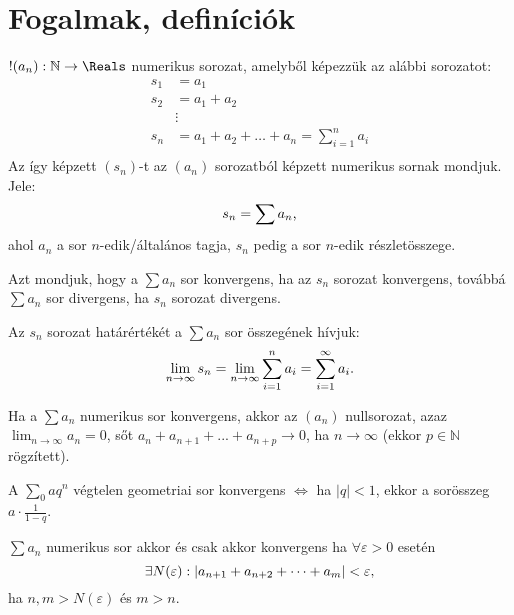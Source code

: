 \section{Fogalmak, definíciók}

\begin{definition}
  $!(a_n) : \mathbb{N} \rightarrow \Reals$ numerikus sorozat, amelyből képezzük
  az alábbi sorozatot:
  \begin{align*}
    s_1 & = a_1                                          \\
    s_2 & = a_1 + a_2                                    \\
        & \vdots                                         \\
    s_n & = a_1 + a_2 + \dots + a_n = \sum_{i=1}^{n} a_i \\
  \end{align*}
  Az így képzett $(s_n)$-t az
  $(a_n)$ sorozatból képzett numerikus sornak mondjuk. Jele:
  \[
    s_n = \sum a_n
    \text,
  \]
  ahol $a_n$ a sor $n$-edik/általános tagja, $s_n$ pedig a sor $n$-edik
  részletösszege.

  Azt mondjuk, hogy a $\sum a_n$ sor konvergens, ha az $s_n$ sorozat konvergens,
  továbbá $\sum a_n$ sor divergens, ha $s_n$ sorozat divergens.

  Az $s_n$ sorozat határértékét a $\sum a_n$ sor összegének hívjuk:
  \[
    \lim_{n \rightarrow \infty} s_n = \lim_{n \rightarrow \infty}
    \sum_{i=1}^n a_i=\sum_{i=1}^\infty a_i
    \text.
  \]
\end{definition}

\begin{theorem}
  Ha a $\sum a_n$ numerikus sor konvergens, akkor az $(a_n)$ nullsorozat, azaz
  $\lim_{n\rightarrow\infty} a_n=0$, sőt $a_n+a_{n+1}+...+a_{n+p} \rightarrow
    0$, ha $n\rightarrow \infty$ (ekkor $p\in\mathbb{N}$ rögzített).
\end{theorem}

\begin{note}
  A $\sum_0 a q^n$ végtelen geometriai sor konvergens $\Leftrightarrow$
  ha $|q|<1$, ekkor a sorösszeg $a\cdot \frac{1}{1-q}$.
\end{note}

\begin{theorem}
  $\sum a_n$ numerikus sor akkor és csak akkor konvergens ha $\forall
    \varepsilon > 0 $ esetén
  \[
    \exists N(\varepsilon): |a_{n + 1} + a_{n + 2} + \dots + a_m| < \varepsilon
    \text,
  \]
  ha $n, m > N(\varepsilon)$ és $m > n$.
\end{theorem}

